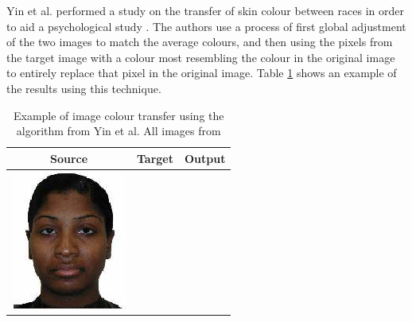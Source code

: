 \begin{table}[H]
\begin{tabular}{|c|c|c|}
\begin{minipage}{.29\textwidth}
  \end{minipage} \\
    \hline
\end{tabular}
\end{table}

Yin et al. performed a study on the transfer of skin colour between races in order to aid a psychological study \cite{yin_2004_transfer}. The authors use a process of first global adjustment of the two images to match the average colours, and then using the pixels from the target image with a colour most resembling the colour in the original image to entirely replace that pixel in the original image. Table \ref{tab:yin_demo} shows an example of the results using this technique.

\begin{table}[H]
    \centering
    \caption{Example of image colour transfer using the algorithm from Yin et al. All images from \cite{yin_2004_transfer} \label{tab:yin_demo}}    
\begin{tabular}{|c|c|c|}
    \hline
    Source & Target & Output \\
    \hline
  \begin{minipage}{.29\textwidth}
    \includegraphics[width=\textwidth,height=\textheight,keepaspectratio]{images/yin_orig1}

\end{minipage}
\end{tabular}
\end{table}
